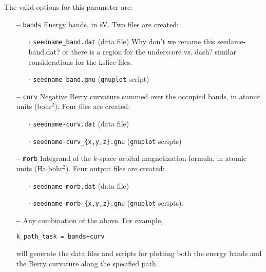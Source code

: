 The valid options for this parameter are:
\begin{itemize}

\item[{\bf --}] \verb#bands# Energy bands, in eV. Two files are
  created:
\begin{itemize}
  
   \item[$\cdot$] {\tt seedname\_band.dat} (data file) {\color{red}
       Why don't we rename this seedame-band.dat? or there is a region
     for the underscore vs. dash? similar considerations for the
     kslice files.}

   \item[$\cdot$] {\tt seedname-band.gnu} ({\tt gnuplot} script)

\end{itemize}

\item[{\bf --}] \verb#curv# Negative Berry curvature summed over the occupied
  bands, in atomic units (bohr$^2$). Four files are created:

\begin{itemize}

   \item[$\cdot$] {\tt seedname-curv.dat} (data file) 

   \item[$\cdot$] {\tt seedname-curv\_\{x,y,z\}.gnu} ({\tt gnuplot} scripts)

\end{itemize}

\item[{\bf --}] \verb#morb# Integrand of the $k$-space orbital
  magnetization formula, in atomic units (Ha$\cdot$bohr$^2$). Four output files are
  created:

\begin{itemize}

   \item[$\cdot$] {\tt seedname-morb.dat} (data file)

   \item[$\cdot$] {\tt seedname-morb\_\{x,y,z\}.gnu} ({\tt gnuplot}
     scripts).

\end{itemize}

\item[{\bf --}] Any combination of the above. For example,

{\tt k\_path\_task = bands+curv}

will generate the data files and scripts for plotting both the energy
bands and the Berry curvature along the specified path.


\end{itemize}

